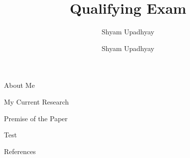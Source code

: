 

\author{Shyam Upadhyay}
\title{Qualifying Exam}

\date{Shyam Upadhyay} 



\begin{frame}
\titlepage
\end{frame}

\begin{frame}{About Me}
\end{frame}

\begin{frame}{My Current Research}
\end{frame}

\begin{frame}{Premise of the Paper}
  \begin{example}
    Test
  \end{example}
\end{frame}






\begin{frame}[allowframebreaks]{References}
  \def\newblock{}
  
  
\end{frame}


